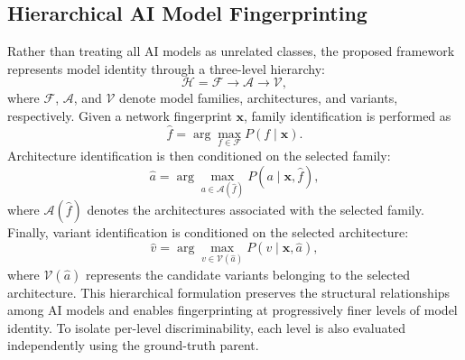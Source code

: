 \subsection{Hierarchical AI Model Fingerprinting}
Rather than treating all AI models as unrelated classes, the proposed framework
represents model identity through a three-level hierarchy:
\begin{equation}
\mathcal{H} =
\mathcal{F}
\rightarrow
\mathcal{A}
\rightarrow
\mathcal{V},
\label{eq:hierarchy}
\end{equation}
where $\mathcal{F}$, $\mathcal{A}$, and $\mathcal{V}$ denote model families,
architectures, and variants, respectively. Given a network fingerprint
$\mathbf{x}$, family identification is performed as
\begin{equation}
\hat{f}
=
\arg\max_{f \in \mathcal{F}}
P(f \mid \mathbf{x}).
\label{eq:family}
\end{equation}
Architecture identification is then conditioned on the selected family:
\begin{equation}
\hat{a}
=
\arg\max_{a \in \mathcal{A}(\hat{f})}
P(a \mid \mathbf{x},\hat{f}),
\label{eq:architecture}
\end{equation}
where $\mathcal{A}(\hat{f})$ denotes the architectures associated with the
selected family. Finally, variant identification is conditioned on the selected
architecture:
\begin{equation}
\hat{v}
=
\arg\max_{v \in \mathcal{V}(\hat{a})}
P(v \mid \mathbf{x},\hat{a}),
\label{eq:variant}
\end{equation}
where $\mathcal{V}(\hat{a})$ represents the candidate variants belonging to the
selected architecture. This hierarchical formulation preserves the structural
relationships among AI models and enables fingerprinting at progressively finer
levels of model identity. To isolate per-level discriminability, each level is
also evaluated independently using the ground-truth parent.

